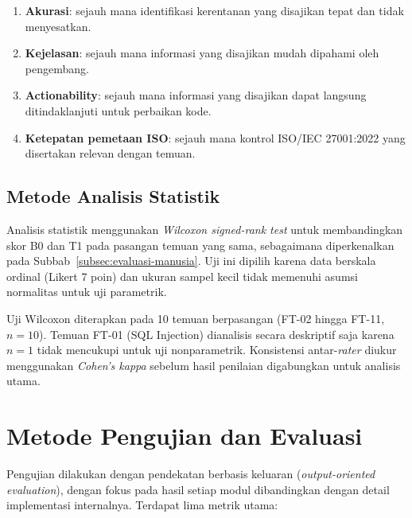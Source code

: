 \begin{enumerate}
    \item \textbf{Akurasi}: sejauh mana identifikasi kerentanan 
    yang disajikan tepat dan tidak menyesatkan.
    \item \textbf{Kejelasan}: sejauh mana informasi yang disajikan 
    mudah dipahami oleh pengembang.
    \item \textbf{Actionability}: sejauh mana informasi yang 
    disajikan dapat langsung ditindaklanjuti untuk perbaikan kode.
    \item \textbf{Ketepatan pemetaan ISO}: sejauh mana kontrol 
    ISO/IEC 27001:2022 yang disertakan relevan dengan temuan.
\end{enumerate}

\subsection{Metode Analisis Statistik}

Analisis statistik menggunakan \textit{Wilcoxon signed-rank test} 
\cite{wilcoxon1945individual} untuk membandingkan skor B0 dan T1 
pada pasangan temuan yang sama, sebagaimana diperkenalkan pada 
Subbab~\ref{subsec:evaluasi-manusia}. Uji ini dipilih karena data 
berskala ordinal (Likert 7 poin) dan ukuran sampel kecil tidak 
memenuhi asumsi normalitas untuk uji parametrik.

Uji Wilcoxon diterapkan pada 10 temuan berpasangan (FT-02 hingga 
FT-11, $n = 10$). Temuan FT-01 (SQL Injection) dianalisis secara 
deskriptif saja karena $n = 1$ tidak mencukupi untuk uji 
nonparametrik. Konsistensi antar-\textit{rater} diukur menggunakan 
\textit{Cohen's kappa} \cite{cohen1960coefficient} sebelum hasil 
penilaian digabungkan untuk analisis utama.

\section{Metode Pengujian dan Evaluasi}

Pengujian dilakukan dengan pendekatan berbasis keluaran 
(\textit{output-oriented evaluation}), dengan fokus pada hasil
setiap modul dibandingkan dengan detail implementasi internalnya.
Terdapat lima metrik utama:

